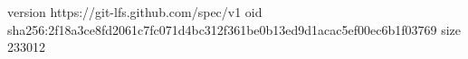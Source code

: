 version https://git-lfs.github.com/spec/v1
oid sha256:2f18a3ce8fd2061c7fc071d4bc312f361be0b13ed9d1acac5ef00ec6b1f03769
size 233012
